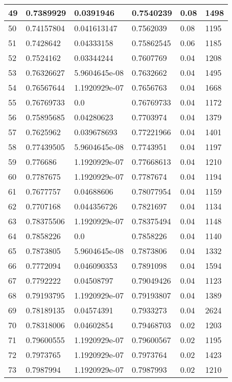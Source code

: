 \begin{longtable}{|l|l|l|l|l|l|}
49 & 0.7389929 & 0.0391946 & 0.7540239 & 0.08 & 1498 \\ \hline 
50 & 0.74157804 & 0.041613147 & 0.7562039 & 0.08 & 1195 \\ \hline 
51 & 0.7428642 & 0.04333158 & 0.75862545 & 0.06 & 1185 \\ \hline 
52 & 0.7524162 & 0.03344244 & 0.7607769 & 0.04 & 1208 \\ \hline 
53 & 0.76326627 & 5.9604645e-08 & 0.7632662 & 0.04 & 1495 \\ \hline 
54 & 0.76567644 & 1.1920929e-07 & 0.7656763 & 0.04 & 1668 \\ \hline 
55 & 0.76769733 & 0.0 & 0.76769733 & 0.04 & 1172 \\ \hline 
56 & 0.75895685 & 0.04280623 & 0.7703974 & 0.04 & 1379 \\ \hline 
57 & 0.7625962 & 0.039678693 & 0.77221966 & 0.04 & 1401 \\ \hline 
58 & 0.77439505 & 5.9604645e-08 & 0.7743951 & 0.04 & 1197 \\ \hline 
59 & 0.776686 & 1.1920929e-07 & 0.77668613 & 0.04 & 1210 \\ \hline 
60 & 0.7787675 & 1.1920929e-07 & 0.7787674 & 0.04 & 1194 \\ \hline 
61 & 0.7677757 & 0.04688606 & 0.78077954 & 0.04 & 1159 \\ \hline 
62 & 0.7707168 & 0.044356726 & 0.7821697 & 0.04 & 1134 \\ \hline 
63 & 0.78375506 & 1.1920929e-07 & 0.78375494 & 0.04 & 1148 \\ \hline 
64 & 0.7858226 & 0.0 & 0.7858226 & 0.04 & 1140 \\ \hline 
65 & 0.7873805 & 5.9604645e-08 & 0.7873806 & 0.04 & 1332 \\ \hline 
66 & 0.7772094 & 0.046090353 & 0.7891098 & 0.04 & 1594 \\ \hline 
67 & 0.7792222 & 0.04508797 & 0.79049426 & 0.04 & 1123 \\ \hline 
68 & 0.79193795 & 1.1920929e-07 & 0.79193807 & 0.04 & 1389 \\ \hline 
69 & 0.78189135 & 0.04574391 & 0.7933273 & 0.04 & 2624 \\ \hline 
70 & 0.78318006 & 0.04602854 & 0.79468703 & 0.02 & 1203 \\ \hline 
71 & 0.79600555 & 1.1920929e-07 & 0.79600567 & 0.02 & 1195 \\ \hline 
72 & 0.7973765 & 1.1920929e-07 & 0.7973764 & 0.02 & 1423 \\ \hline 
73 & 0.7987994 & 1.1920929e-07 & 0.7987993 & 0.02 & 1210 \\ \hline 

\end{longtable}
